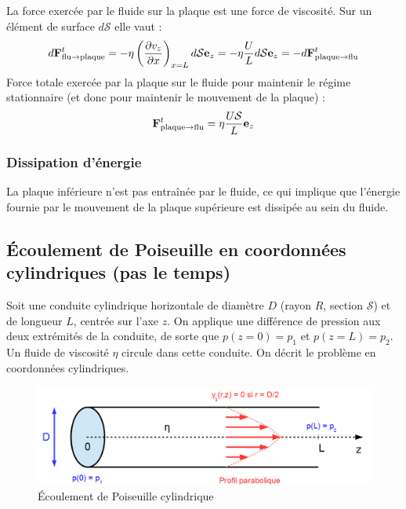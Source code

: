 \documentclass[11pt,a4paper]{report}
\begin{document}
La force exercée par le fluide sur la plaque est une force de viscosité. Sur un élément de surface $d\mathcal{S}$ elle vaut :
\begin{equation}
	d\bold{F}_{\text{flu}\rightarrow\text{plaque}}^t 
	= - \eta \left(\frac{\partial v_z}{\partial x}\right)_{x=L} d\mathcal{S} \bold{e}_z 
	= - \eta \frac{U}{L} d\mathcal{S} \bold{e}_z 
	= - d\bold{F}_{\text{plaque}\rightarrow\text{flu}}^t
\end{equation}
Force totale exercée par la plaque sur le fluide pour maintenir le régime stationnaire (et donc pour maintenir le mouvement de la plaque) :
\begin{equation}
	\bold{F}_{\text{plaque}\rightarrow\text{flu}}^t = \eta \frac{U\mathcal{S}}{L} \bold{e}_z 
\end{equation}

\subsubsection{Dissipation d'énergie}

La plaque inférieure n'est pas entraînée par le fluide, ce qui implique que l'énergie fournie par le mouvement de la plaque supérieure est dissipée au sein du fluide.

\newpage
\subsection{Écoulement de Poiseuille en coordonnées cylindriques (pas le temps)}\label{sec:3.3}

Soit une conduite cylindrique horizontale de diamètre $D$ (rayon $R$, section $\mathcal{S}$) et de longueur $L$, centrée sur l'axe $z$. On applique une différence de pression aux deux extrémités de la conduite, de sorte que $p(z=0) = p_1$ et $p(z=L) = p_2$. Un fluide de viscosité $\eta$ circule dans cette conduite. On décrit le problème en coordonnées cylindriques. 

\begin{figure}[h!]
\begin{center}
	\includegraphics[scale = 0.3]{poiseuille_cyl.png}
	\caption{\'Ecoulement de Poiseuille cylindrique} 
	\label{fig:poiseuille_cyl}
\end{center}
\end{figure}
\end{document}
